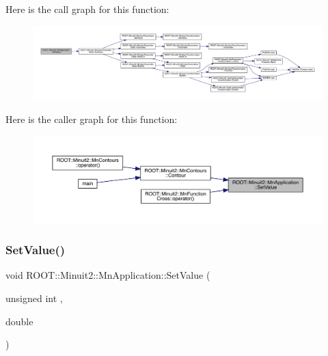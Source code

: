Here is the call graph for this function\+:
\nopagebreak
\begin{figure}[H]
\begin{center}
\leavevmode
\includegraphics[width=350pt]{df/dd5/classROOT_1_1Minuit2_1_1MnApplication_af6147ded182dfe93c2200d621050c642_cgraph}
\end{center}
\end{figure}
Here is the caller graph for this function\+:
\nopagebreak
\begin{figure}[H]
\begin{center}
\leavevmode
\includegraphics[width=350pt]{df/dd5/classROOT_1_1Minuit2_1_1MnApplication_af6147ded182dfe93c2200d621050c642_icgraph}
\end{center}
\end{figure}
\mbox{\label{classROOT_1_1Minuit2_1_1MnApplication_af6147ded182dfe93c2200d621050c642}} 
\subsubsection{\texorpdfstring{SetValue()}{SetValue()}\hspace{0.1cm}{\footnotesize\ttfamily [3/6]}}
{\footnotesize\ttfamily void R\+O\+O\+T\+::\+Minuit2\+::\+Mn\+Application\+::\+Set\+Value (\begin{DoxyParamCaption}\item[{unsigned int}]{,  }\item[{double}]{ }\end{DoxyParamCaption})}

\mbox{\label{classROOT_1_1Minuit2_1_1MnApplication_af8376fc6c9a727c8f3dbdc268afb0e7e}} 
